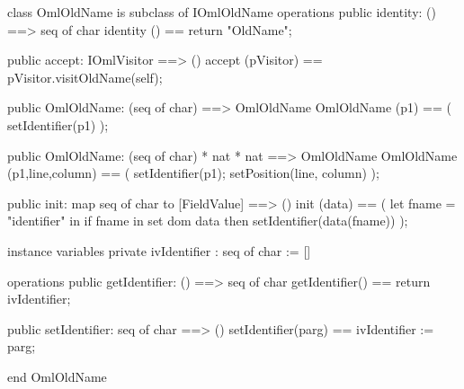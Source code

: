 \begin{vdm_al}
class OmlOldName is subclass of IOmlOldName
operations
  public identity: () ==> seq of char
  identity () == return "OldName";

  public accept: IOmlVisitor ==> ()
  accept (pVisitor) == pVisitor.visitOldName(self);

  public OmlOldName:
    (seq of char) ==> OmlOldName
  OmlOldName (p1) == 
    ( setIdentifier(p1) );

  public OmlOldName:
    (seq of char) *
    nat *
    nat ==> OmlOldName
  OmlOldName (p1,line,column) == 
    ( setIdentifier(p1);
      setPosition(line, column) );

  public init: map seq of char to [FieldValue] ==> ()
  init (data) ==
    ( let fname = "identifier" in
        if fname in set dom data
        then setIdentifier(data(fname)) );

instance variables
  private ivIdentifier : seq of char := []

operations
  public getIdentifier: () ==> seq of char
  getIdentifier() == return ivIdentifier;

  public setIdentifier: seq of char ==> ()
  setIdentifier(parg) == ivIdentifier := parg;

end OmlOldName
\end{vdm_al}

